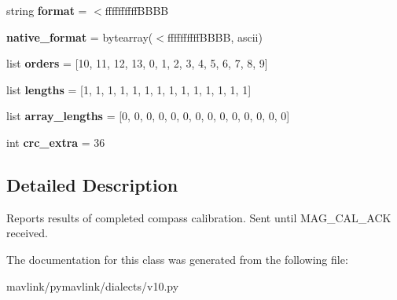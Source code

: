\begin{DoxyCompactItemize}
\item 
\mbox{\label{classpymavlink_1_1dialects_1_1v10_1_1MAVLink__mag__cal__report__message_a82bda27635c8b27965c668da4a9315bd}} 
string {\bfseries format} = \textquotesingle{}$<$ffffffffff\+B\+B\+BB\textquotesingle{}
\item 
\mbox{\label{classpymavlink_1_1dialects_1_1v10_1_1MAVLink__mag__cal__report__message_a941ca276840014778c0730ec1e994fa2}} 
{\bfseries native\+\_\+format} = bytearray(\textquotesingle{}$<$ffffffffff\+B\+B\+BB\textquotesingle{}, \textquotesingle{}ascii\textquotesingle{})
\item 
\mbox{\label{classpymavlink_1_1dialects_1_1v10_1_1MAVLink__mag__cal__report__message_aeb3ec53af8434b39f791913c09432836}} 
list {\bfseries orders} = \mbox{[}10, 11, 12, 13, 0, 1, 2, 3, 4, 5, 6, 7, 8, 9\mbox{]}
\item 
\mbox{\label{classpymavlink_1_1dialects_1_1v10_1_1MAVLink__mag__cal__report__message_ac4368e8ca74ca0aa406a955637c64af1}} 
list {\bfseries lengths} = \mbox{[}1, 1, 1, 1, 1, 1, 1, 1, 1, 1, 1, 1, 1, 1\mbox{]}
\item 
\mbox{\label{classpymavlink_1_1dialects_1_1v10_1_1MAVLink__mag__cal__report__message_a0814be51d362166820635ebed7e24636}} 
list {\bfseries array\+\_\+lengths} = \mbox{[}0, 0, 0, 0, 0, 0, 0, 0, 0, 0, 0, 0, 0, 0\mbox{]}
\item 
\mbox{\label{classpymavlink_1_1dialects_1_1v10_1_1MAVLink__mag__cal__report__message_acadb91326934612f67a413eeba5d0271}} 
int {\bfseries crc\+\_\+extra} = 36
\end{DoxyCompactItemize}


\subsection{Detailed Description}
\begin{DoxyVerb}Reports results of completed compass calibration. Sent until
MAG_CAL_ACK received.
\end{DoxyVerb}
 

The documentation for this class was generated from the following file\+:\begin{DoxyCompactItemize}
\item 
mavlink/pymavlink/dialects/v10.\+py\end{DoxyCompactItemize}
